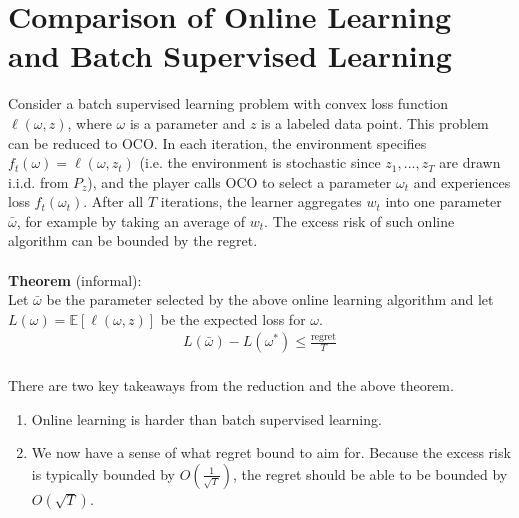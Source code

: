 \documentclass[11pt]{article}
\newcommand\bbE{\ensuremath{\mathbb{E}}} %
\newcommand{\1}{\mathbb{I}} %
\begin{document}
\section{Comparison of Online Learning and Batch Supervised Learning}
Consider a batch supervised learning problem with convex loss function $\ell(\omega, z)$, where $\omega$ is a parameter and $z$ is a labeled data point. This problem can be reduced to OCO. In each iteration, the environment specifies $f_t(\omega) = \ell(\omega, z_t)$ (i.e. the environment is stochastic since $z_1, ..., z_T$ are drawn i.i.d. from $P_z$), and the player calls OCO to select a parameter $\omega_t$ and experiences loss $f_t(\omega_t)$. After all $T$ iterations, the learner aggregates $w_t$ into one parameter $\bar{\omega}$, for example by taking an average of $w_t$. The excess risk of such online algorithm can be bounded by the regret.\\\\
\textbf{Theorem} (informal):\\ Let $\bar{\omega}$ be the parameter selected by the above online learning algorithm and let $L(\omega) = \bbE[\ell(\omega, z)]$ be the expected loss for $\omega$. 
\begin{align*}
L(\bar{\omega}) - L(\omega^*) \le \frac{\text{regret}}{T}
\end{align*}
\\
There are two key takeaways from the reduction and the above theorem.
\begin{enumerate}
\item Online learning is harder than batch supervised learning. 
\item We now have a sense of what regret bound to aim for. Because the excess risk is typically bounded by $O(\frac{1}{\sqrt{T}})$, the regret should be able to be bounded by $O(\sqrt{T})$.
\end{enumerate}
\end{document}
